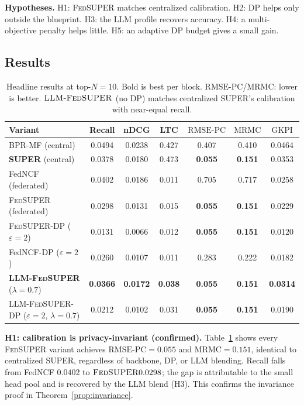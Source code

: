 \documentclass{article}
\newcommand{\Fed}{\textsc{FedSUPER}}
\newcommand{\LLMSuper}{\textsc{LLM-FedSUPER}}
\newcommand{\RMSEPC}{\mathrm{RMSE\text{-}PC}}
\newcommand{\MRMC}{\mathrm{MRMC}}
\newcommand{\GKPI}{\mathrm{GKPI}}
\begin{document}
\textbf{Hypotheses.} H1: \Fed{} matches centralized calibration. H2: DP helps only outside the
blueprint. H3: the LLM profile recovers accuracy. H4: a multi-objective penalty helps little. H5:
an adaptive DP budget gives a small gain.

\subsection{Results}

\begin{table}[t]
\caption{Headline results at top-\(N{=}10\). Bold is best per block. \(\RMSEPC\)/\(\MRMC\): lower
is better. \(\LLMSuper\) (no DP) matches centralized SUPER's calibration with near-equal recall.}
\label{tab:main}
\centering\small
\begin{tabular}{lcccccc}
\toprule
Variant & Recall & nDCG & LTC & \(\RMSEPC\) & \(\MRMC\) & \(\GKPI\) \\
\midrule
BPR-MF (central)          & 0.0494 & 0.0238 & 0.427 & 0.407 & 0.410 & 0.0464 \\
\textbf{SUPER} (central)  & 0.0378 & 0.0180 & 0.473 & \textbf{0.055} & \textbf{0.151} & 0.0353 \\
\midrule
FedNCF (federated)        & 0.0402 & 0.0186 & 0.011 & 0.705 & 0.717 & 0.0258 \\
\midrule
\Fed{} (federated)        & 0.0298 & 0.0131 & 0.015 & \textbf{0.055} & \textbf{0.151} & 0.0229 \\
\Fed{}-DP (\(\varepsilon{=}2\)) & 0.0131 & 0.0066 & 0.012 & \textbf{0.055} & \textbf{0.151} & 0.0120 \\
FedNCF-DP (\(\varepsilon{=}2\)) & 0.0260 & 0.0107 & 0.011 & 0.283 & 0.222 & 0.0182 \\
\midrule
\textbf{\LLMSuper} (\(\lambda{=}0.7\)) & \textbf{0.0366} & \textbf{0.0172} & \textbf{0.038} & \textbf{0.055} & \textbf{0.151} & \textbf{0.0314} \\
\LLMSuper-DP (\(\varepsilon{=}2\), \(\lambda{=}0.7\)) & 0.0212 & 0.0102 & 0.031 & \textbf{0.055} & \textbf{0.151} & 0.0190 \\
\bottomrule
\end{tabular}
\end{table}

\textbf{H1: calibration is privacy-invariant (confirmed).}
Table~\ref{tab:main} shows every \Fed{} variant achieves \(\RMSEPC{=}0.055\) and
\(\MRMC{=}0.151\), identical to centralized SUPER, regardless of backbone, DP, or LLM blending.
Recall falls from FedNCF \(0.0402\) to \(\Fed{} 0.0298\); the gap is attributable to the small
head pool and is recovered by the LLM blend (H3). This confirms the invariance proof in
Theorem~\ref{prop:invariance}.
\end{document}

